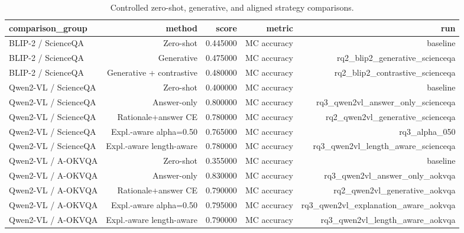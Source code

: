 \begin{table}
\caption{Controlled zero-shot, generative, and aligned strategy comparisons.}
\label{tab:controlled_strategy}
\begin{tabular}{lrrrr}
\toprule
comparison_group & method & score & metric & run \\
\midrule
BLIP-2 / ScienceQA & Zero-shot & 0.445000 & MC accuracy & baseline \\
BLIP-2 / ScienceQA & Generative & 0.475000 & MC accuracy & rq2_blip2_generative_scienceqa \\
BLIP-2 / ScienceQA & Generative + contrastive & 0.480000 & MC accuracy & rq2_blip2_contrastive_scienceqa \\
Qwen2-VL / ScienceQA & Zero-shot & 0.400000 & MC accuracy & baseline \\
Qwen2-VL / ScienceQA & Answer-only & 0.800000 & MC accuracy & rq3_qwen2vl_answer_only_scienceqa \\
Qwen2-VL / ScienceQA & Rationale+answer CE & 0.780000 & MC accuracy & rq2_qwen2vl_generative_scienceqa \\
Qwen2-VL / ScienceQA & Expl.-aware alpha=0.50 & 0.765000 & MC accuracy & rq3_alpha_050 \\
Qwen2-VL / ScienceQA & Expl.-aware length-aware & 0.780000 & MC accuracy & rq3_qwen2vl_length_aware_scienceqa \\
Qwen2-VL / A-OKVQA & Zero-shot & 0.355000 & MC accuracy & baseline \\
Qwen2-VL / A-OKVQA & Answer-only & 0.830000 & MC accuracy & rq3_qwen2vl_answer_only_aokvqa \\
Qwen2-VL / A-OKVQA & Rationale+answer CE & 0.790000 & MC accuracy & rq2_qwen2vl_generative_aokvqa \\
Qwen2-VL / A-OKVQA & Expl.-aware alpha=0.50 & 0.795000 & MC accuracy & rq3_qwen2vl_explanation_aware_aokvqa \\
Qwen2-VL / A-OKVQA & Expl.-aware length-aware & 0.790000 & MC accuracy & rq3_qwen2vl_length_aware_aokvqa \\
\bottomrule
\end{tabular}
\end{table}
